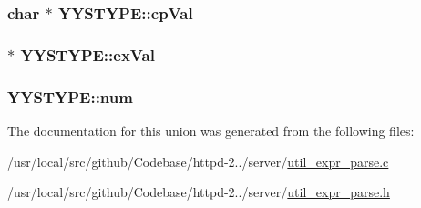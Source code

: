 \subsubsection[{\texorpdfstring{cp\+Val}{cpVal}}]{\setlength{\rightskip}{0pt plus 5cm}char $\ast$ Y\+Y\+S\+T\+Y\+P\+E\+::cp\+Val}\hypertarget{unionYYSTYPE_ae72ddd319c919f8ff6b80b18c5a83e06}{}\label{unionYYSTYPE_ae72ddd319c919f8ff6b80b18c5a83e06}
\subsubsection[{\texorpdfstring{ex\+Val}{exVal}}]{ $\ast$ Y\+Y\+S\+T\+Y\+P\+E\+::ex\+Val}\hypertarget{unionYYSTYPE_a5cd67677ec2dad472d7966eb75d9b0a4}{}\label{unionYYSTYPE_a5cd67677ec2dad472d7966eb75d9b0a4}
\subsubsection[{\texorpdfstring{num}{num}}]{ Y\+Y\+S\+T\+Y\+P\+E\+::num}\hypertarget{unionYYSTYPE_a682841bb1e050ccf132867fe08502496}{}\label{unionYYSTYPE_a682841bb1e050ccf132867fe08502496}


The documentation for this union was generated from the following files\+:\begin{DoxyCompactItemize}
\item 
/usr/local/src/github/\+Codebase/httpd-\/2../server/\hyperlink{util__expr__parse_8c}{util\+\_\+expr\+\_\+parse.\+c}\item 
/usr/local/src/github/\+Codebase/httpd-\/2../server/\hyperlink{util__expr__parse_8h}{util\+\_\+expr\+\_\+parse.\+h}\end{DoxyCompactItemize}
